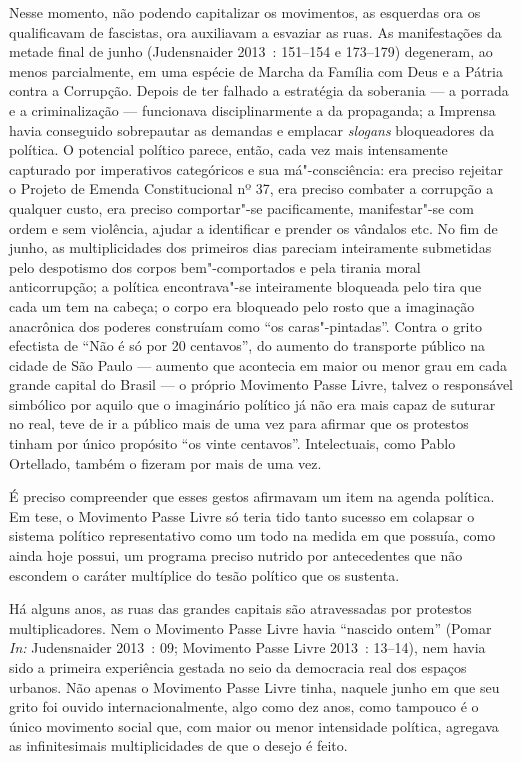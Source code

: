 Nesse momento, não podendo capitalizar os movimentos, as esquerdas ora
os qualificavam de fascistas, ora auxiliavam a esvaziar as ruas. As
manifestações da metade final de junho (Judensnaider 2013~: 151--154 e
173--179) degeneram, ao menos parcialmente, em uma espécie de Marcha da
Família com Deus e a Pátria contra a Corrupção. Depois de ter falhado a
estratégia da soberania --- a porrada e a criminalização --- funcionava
disciplinarmente a da propaganda; a Imprensa havia conseguido
sobrepautar as demandas e emplacar \emph{slogans }bloqueadores da
política. O potencial político parece, então, cada vez mais intensamente
capturado por imperativos categóricos e sua má"-consciência: era preciso
rejeitar o Projeto de Emenda Constitucional nº 37, era preciso combater
a corrupção a qualquer custo, era preciso comportar"-se pacificamente,
manifestar"-se com ordem e sem violência, ajudar a identificar e prender
os vândalos etc. No fim de junho, as multiplicidades dos primeiros dias
pareciam inteiramente submetidas pelo despotismo dos corpos
bem"-comportados e pela tirania moral anticorrupção; a política
encontrava"-se inteiramente bloqueada pelo tira que cada um tem na
cabeça; o corpo era bloqueado pelo rosto que a imaginação anacrônica dos
poderes construíam como ``os caras"-pintadas''. Contra o grito efectista
de ``Não é só por 20 centavos'', do aumento do transporte público na
cidade de São Paulo --- aumento que acontecia em maior ou menor grau em
cada grande capital do Brasil --- o próprio Movimento Passe Livre, talvez
o responsável simbólico por aquilo que o imaginário político já não era
mais capaz de suturar no real, teve de ir a público mais de uma vez para
afirmar que os protestos tinham por único propósito ``os vinte
centavos''. Intelectuais, como Pablo Ortellado, também o fizeram por
mais de uma vez.

É preciso compreender que esses gestos afirmavam um item na agenda
política. Em tese, o Movimento Passe Livre só teria tido tanto sucesso
em colapsar o sistema político representativo como um todo na medida em
que possuía, como ainda hoje possui, um programa preciso nutrido por
antecedentes que não escondem o caráter multíplice do tesão político que
os sustenta.

Há alguns anos, as ruas das grandes capitais são atravessadas por
protestos multiplicadores. Nem o Movimento Passe Livre havia ``nascido
ontem'' (Pomar \emph{In: }Judensnaider 2013~: 09; Movimento Passe Livre
2013~: 13--14), nem havia sido a primeira experiência gestada
no seio da democracia real dos espaços urbanos. Não apenas o Movimento
Passe Livre tinha, naquele junho em que seu grito foi ouvido
internacionalmente, algo como dez anos, como tampouco é o único
movimento social que, com maior ou menor intensidade política, agregava
as infinitesimais multiplicidades de que o desejo é feito.


